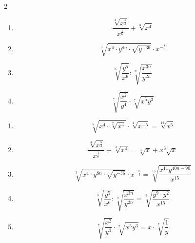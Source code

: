 {{\begin{multicols}{2}
\begin{enumerate}[label=\alph*)]
  \item $$\frac{\sqrt[4]{x^{\frac53}}}{x^{\frac16}} + \sqrt[3]{x^4}$$

 \item $$\sqrt[3]{x^4\cdot{} y^{8n}\cdot{}  \sqrt{y^{-36}}} \cdot{} x^{-\frac85}$$

 \item $$ \sqrt[3]{\frac{y^5}{x^6}}   : \sqrt[n]{\frac{x^{3n}}{y^{2n}}}$$

 \item $$ \sqrt[7]{\frac{x^2}{y^4}}   \cdot \sqrt[7]{x^5y^3}$$
 \end{enumerate}
\end{multicols}

}{%
\begin{enumerate}[label=\alph*)]
  \item $$\sqrt[5]{x^4\cdot{}\sqrt[2]{x^4}} \cdot{} \sqrt[4]{x^{-5}}
    = \sqrt[12]{x^5}$$

  \item $$\frac{\sqrt[4]{x^{\frac53}}}{x^{\frac16}} + \sqrt[3]{x^4} =
    \sqrt[4]{x} + x^3\sqrt{x}$$

 \item $$\sqrt[3]{x^4\cdot{} y^{8n}\cdot{}  \sqrt{y^{-36}}} \cdot{}
   x^{-\frac85} = \sqrt[15]{\frac{x^11y^{40n-90}}{x^{15}}}$$

 \item $$ \sqrt[3]{\frac{y^5}{x^6}}   :
   \sqrt[n]{\frac{x^{3n}}{y^{2n}}} = \sqrt[3]{\frac{y^9\cdot{}y^2}{x^{15}}}$$

 \item $$ \sqrt[7]{\frac{x^2}{y^4}}   \cdot \sqrt[7]{x^5y^3} =
   x\cdot{} \sqrt[7]{\frac1y}$$

\end{enumerate}
}%






}
